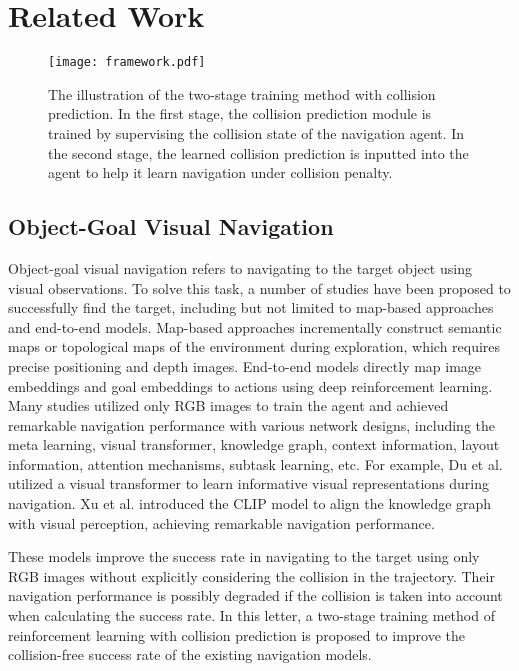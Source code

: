 \section{Related Work}
\begin{figure*}[t]
\centerline{\texttt{[image: framework.pdf]}}
\caption{The illustration of the two-stage training method with collision prediction. In the first stage, the collision prediction module is trained by supervising the collision state of the navigation agent. In the second stage, the learned collision prediction is inputted into the agent to help it learn navigation under collision penalty.}
\label{fw}
\end{figure*}

\subsection{Object-Goal Visual Navigation}

Object-goal visual navigation refers to navigating to the target object using visual observations. To solve this task, a number of studies have been proposed to successfully find the target, including but not limited to map-based approaches and end-to-end models. Map-based approaches incrementally construct semantic maps\cite{cow, goat} or topological maps\cite{wu2024voronav} of the environment during exploration, which requires precise positioning and depth images. End-to-end models directly map image embeddings and goal embeddings to actions using deep reinforcement learning. Many studies utilized only RGB images to train the agent and achieved remarkable navigation performance with various network designs, including the meta learning\cite{SAVN}, visual transformer\cite{VTNet, OMT}, knowledge graph\cite{ORG, hoz, akgvp}, context information\cite{mjol, ral, SSNet, Li}, layout information\cite{lstde}, attention mechanisms\cite{SpatialAtt, tdanet}, subtask learning\cite{tro}, etc. For example, Du et al.\cite{VTNet} utilized a visual transformer\cite{transformer} to learn informative visual representations during navigation. Xu et al.\cite{akgvp} introduced the CLIP model\cite{CLIP} to align the knowledge graph with visual perception, achieving remarkable navigation performance.

These models improve the success rate in navigating to the target using only RGB images without explicitly considering the collision in the trajectory. Their navigation performance is possibly degraded if the collision is taken into account when calculating the success rate. In this letter, a two-stage training method of reinforcement learning with collision prediction is proposed to improve the collision-free success rate of the existing navigation models. 

